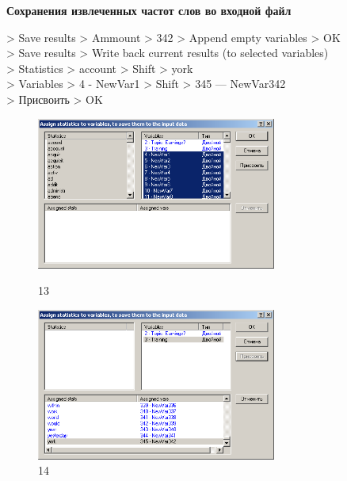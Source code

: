 \begin{center}
  \textbf{Сохранения извлеченных частот слов во входной файл}
\end{center}

> Save results > Ammount > 342 > Append empty variables > OK \\
> Save results > Write back current results (to selected variables) \\
> Statistics > account > Shift > york \\
> Variables > 4 - NewVar1 > Shift > 345 — NewVar342 \\
> Присвоить > OK \\

\begin{figure}[!h]
  \centering

  \begin{minipage}{0.49\textwidth}
    \centering

    \includegraphics[height=5cm]
    {inc/13.PNG}

    \caption{13}

    \label{fig:13}
  \end{minipage}
  \begin{minipage}{0.49\textwidth}
    \centering

    \includegraphics[height=5cm]
    {inc/14.PNG}

    \caption{14}

    \label{fig:14}
  \end{minipage}
\end{figure}

